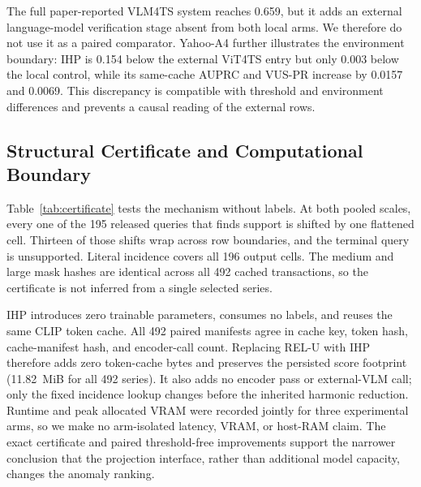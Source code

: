 The full paper-reported VLM4TS system reaches 0.659, but it adds an external
language-model verification stage absent from both local arms. We therefore
do not use it as a paired comparator. Yahoo-A4 further illustrates the
environment boundary: IHP is 0.154 below the external ViT4TS entry but only
0.003 below the local control, while its same-cache AUPRC and VUS-PR increase
by 0.0157 and 0.0069. This discrepancy is compatible with threshold and
environment differences and prevents a causal reading of the external rows.

\subsection{Structural Certificate and Computational Boundary}

Table~\ref{tab:certificate} tests the mechanism without labels. At both
pooled scales, every one of the 195 released queries that finds support is
shifted by one flattened cell. Thirteen of those shifts wrap across row
boundaries, and the terminal query is unsupported. Literal incidence covers
all 196 output cells. The medium and large mask hashes are identical across
all 492 cached transactions, so the certificate is not inferred from a
single selected series.

\begin{table}[t]
  \centering
  \caption{Label-free support-graph certificate on the $14\times14$ grid.
  ``Rel. valid'' counts shifted queries returning support; all 195 are
  displaced. ``Row wraps'' is the subset crossing a row boundary.}
  \label{tab:certificate}
  \footnotesize
\end{table}

IHP introduces zero trainable parameters, consumes no labels, and reuses the
same CLIP token cache. All 492 paired manifests agree in cache key, token hash,
cache-manifest hash, and encoder-call count. Replacing \textsc{REL-U} with IHP
therefore adds zero token-cache bytes and preserves the persisted score
footprint (11.82~MiB for all 492 series). It also adds no encoder pass or
external-VLM call; only the fixed incidence lookup changes before the
inherited harmonic reduction. Runtime and peak allocated VRAM were recorded
jointly for three experimental arms, so we make no arm-isolated latency, VRAM,
or host-RAM claim. The exact certificate and paired threshold-free
improvements support the narrower conclusion that the projection interface,
rather than additional model capacity, changes the anomaly ranking.
